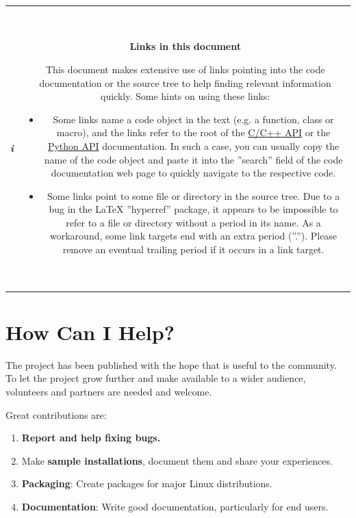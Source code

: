 \documentclass[12pt,english,parskip=half,headheight=19pt]{scrreprt}
\newcommand{\infobox}[1]{
  \par
  \medskip
  \hfill
  \setlength\arrayrulewidth{1pt}
  \begin{tabular}[t]{c|c|}
    \parbox{1.8em}{\hfill\textit{\Huge\textbf{i}\,}}
    &
    \,\parbox{0.89\linewidth}{\setlength{\parskip}{0.5em} \small #1}\,
  \end{tabular}
  \medskip
  \par
}
\newcommand{\refdoc}[2]{\href{#1}{#2}}              %
\newcommand{\theapic}{\refdoc{home2l-api_c/index.html}{C/C++ API}}
\newcommand{\theapipython}{\refdoc{home2l-api_python/index.html}{Python API}}
\begin{document}
\infobox{
  \textbf{Links in this document}

  This document makes extensive use of links pointing into the code documentation or the source tree to help finding
  relevant information quickly. Some hints on using these links:
  \begin{itemize}
    \item
      Some links name a code object in the text (e.g. a function, class or macro), and the links refer to the root
      of the \theapic{} or the \theapipython{} documentation. In such a case, you can usually copy the name of the code object
      and paste it into the ''search'' field of the code documentation web page to quickly navigate to the respective code.
    \item
      Some links point to some file or directory in the source tree. Due to a bug in the LaTeX ''hyperref'' package,
      it appears to be impossible to refer to a file or directory without a period in its name.
      As a workaround, some link targets end with an extra period (''.'').
      Please remove an eventual trailing period if it occurs in a link target.
  \end{itemize}
}



\clearpage
\section{How Can I Help?}
\label{sec:helping}


The project has been published with the hope that is useful to the community.
To let the project grow further and make available to a wider audience,
volunteers and partners are needed and welcome.

Great contributions are:

\begin{enumerate}

  \item \textbf{Report and help fixing bugs.}

  \item Make \textbf{sample installations}, document them and share your experiences.

  \item \textbf{Packaging}: Create packages for major Linux distributions.

  \item \textbf{Documentation}: Write good documentation, particularly for end users.

\end{enumerate}
\end{document}
